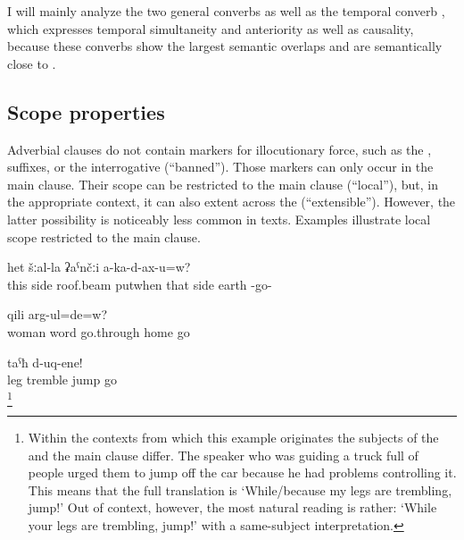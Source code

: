 I will mainly analyze the two general converbs as well as the temporal converb  , which expresses temporal simultaneity and anteriority as well as causality, because these converbs show the largest semantic overlaps and are semantically close to .



\subsection{Scope properties}
\label{ssec:Scope properties}

Adverbial clauses do not contain markers for illocutionary force, such as the ,  suffixes, or the interrogative  (``banned''). Those markers can only occur in the main clause. Their scope can be restricted to the main clause (``local''), but, in the appropriate context, it can also extent across the  (``extensible''). However, the latter possibility is noticeably less common in texts. Examples  illustrate local scope restricted to the main clause.
%
\begin{exe}
	\ex	\label{ex:When you put the roof beam at this (at one) side}
	\gll	[hej	šːal-li-cːe	cːiχːin	ka-b-alt-an=qːel]	het	šːal-la	ʡaˁnčːi	a-ka-d-ax-u=w?\\
		this	side	roof.beam	putwhen	that	side	earth	-go-\\
	\glt	{}

	\ex	\label{ex:Do you go home because your wife told you to}
		qili	arg-ul=de=w?\\
			woman	word	go.through	home	go\\
	\glt	{}

	\ex	\label{ex:‎‎The legs are trembling, jump}
	\gll	[t'uˁ-me	rurčː-ul]	taˁħ	d-uq-ene!\\
		leg	tremble	jump	go\\
	\glt	{}\footnote{Within the contexts from which this example originates the subjects of the  and the main clause differ. The speaker who was guiding a truck full of people urged them to jump off the car because he had problems controlling it. This means that the full translation is `While/because my legs are trembling, jump!’ Out of context, however, the most natural reading is rather: `While your legs are trembling, jump!’ with a same-subject interpretation.}
\end{exe}

